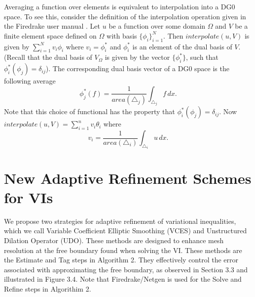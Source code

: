 \documentclass[12 pt]{report}
\begin{document}
Averaging a function over elements is equivalent to interpolation into a DG0 space. To see this, consider the definition of the interpolation operation given in the Firedrake user manual \citep{ham_firedrake_2023}. 
Let $u$ be a function over some domain $\Omega$ and $V$ be a finite element space defined on $\Omega$ with basis $\{\phi_i\}_{i = 1}^N$. Then $interpolate(u, V)$ is given by $\sum_{i = 1}^N v_i \phi_i$ where $v_i = \phi^*_i$ and $\phi^*_i$ is an element of the dual basis of $V$. (Recall that the dual basis of $V_\Omega$ is given by the vector $\{\phi^*_i\}$, such that $\phi^*_i(\phi_j) = \delta_{ij}$). The corresponding dual basis vector of a DG0 space is the following average
\begin{equation}
  \phi_j^*(f) = \frac{1}{area(\triangle_j)}\int_{\triangle_j} f\, dx.
\end{equation}
Note that this choice of functional has the property that $\phi^*_i(\phi_j) = \delta_{ij}$. Now $interpolate(u, V) = \sum_{i = 1}^n v_i\theta_i$ where
\begin{equation}
  v_i = \frac{1}{area(\triangle_i)}\int_{\triangle_i} u \, dx.
\end{equation}


\chapter{New Adaptive Refinement Schemes for VIs}

We propose two strategies for adaptive refinement of variational inequalities, which we call Variable Coefficient Elliptic Smoothing (VCES) and Unstructured Dilation Operator (UDO). These methods are designed to enhance mesh resolution at the free boundary found when solving the VI. These methods are the Estimate and Tag steps in Algorithm 2. They effectively control the error associated with approximating the free boundary, as observed in Section 3.3 and illustrated in Figure 3.4. Note that Firedrake/Netgen is used for the Solve and Refine steps in Algorithim 2.
\end{document}
